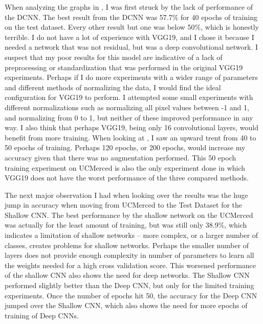 \documentclass[12pt]{article}
\begin{document}
	When analyzing the graphs in , I was first struck by the lack of performance of the DCNN.  The best result from the DCNN was 57.7\% for 40 epochs of training on the test dataset. Every other result but one was below 50\%, which is honestly terrible. I do not have a lot of experience with VGG19, and I chose it because I needed a network that was not residual, but was a deep convolutional network. I suspect that my poor results for this model are indicative of a lack of preprocessing or standardization that was performed in the original VGG19 experiments. Perhaps if I do more experiments with a wider range of parameters and different methods of normalizing the data, I would find the ideal configuration for VGG19 to perform. I attempted some small experiments with different normalizations such as normalizing all pixel values between -1 and 1, and normalizing from 0 to 1, but neither of these improved performance in any way. I also think that perhaps VGG19, being only 16 convolutional layers, would benefit from more training. When looking at , I saw an upward trent from 40 to 50 epochs of training. Perhaps 120 epochs, or 200 epochs, would increase my accuracy given that there was no augmentation performed. This 50 epoch training experiment on UCMerced is also the only experiment done in which VGG19 does not have the worst performance of the three compared methods. 
	
	The next major observation I had when looking over the results was the huge jump in accuracy when moving from UCMerced to the Test Dataset for the Shallow CNN. The best performance by the shallow network on the UCMerced was actually for the least amount of training, but was still only 38.9\%, which indicates a limitation of shallow networks -- more complex, or a larger number of classes, creates problems for shallow networks. Perhaps the smaller number of layers does not provide enough complexity in number of parameters to learn all the weights needed for a high cross validation score. This worsened performance of the shallow CNN also shows the need for deep networks. The Shallow CNN performed slightly better than the Deep CNN, but only for the limited training experiments. Once the number of epochs hit 50, the accuracy for the Deep CNN jumped over the Shallow CNN, which also shows the need for more epochs of training of Deep CNNs. 
	
\end{document}

